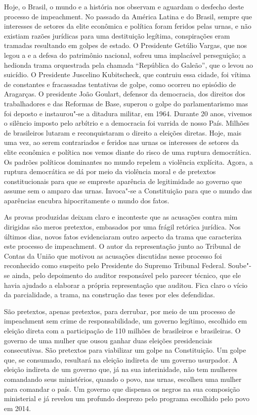 Hoje, o Brasil, o mundo e a história
nos observam e aguardam o desfecho deste processo de impeachment. No
passado da América Latina e do Brasil, sempre que interesses de setores
da elite econômica e política foram feridos pelas urnas, e não existiam
razões jurídicas para uma destituição legítima, conspirações eram
tramadas resultando em golpes de estado. O Presidente Getúlio Vargas,
que nos legou a  e a defesa do patrimônio nacional, sofreu uma
implacável perseguição; a hedionda trama orquestrada pela chamada
``República do Galeão'', que o levou ao suicídio. O Presidente Juscelino
Kubitscheck, que contruiu essa cidade, foi vítima de constantes e
fracassadas tentativas de golpe, como ocorreu no episódio de Aragarças.
O presidente João Goulart, defensor da democracia, dos direitos dos
trabalhadores e das Reformas de Base, superou o golpe do parlamentarismo
mas foi deposto e instaurou"-se a ditadura militar, em 1964. Durante 20
anos, vivemos o silêncio imposto pelo arbítrio e a democracia foi
varrida de nosso País. Milhões de brasileiros lutaram e reconquistaram o
direito a eleições diretas. Hoje, mais uma vez, ao serem contrariados e
feridos nas urnas os interesses de setores da elite econômica e política
nos vemos diante do risco de uma ruptura democrática. Os padrões
políticos dominantes no mundo repelem a violência explícita. Agora, a
ruptura democrática se dá por meio da violência moral e de pretextos
constitucionais para que se empreste aparência de legitimidade ao
governo que assume sem o amparo das urnas. Invoca"-se a Constituição para
que o mundo das aparências encubra hipocritamente o mundo dos fatos.

As provas produzidas deixam claro e inconteste que as acusações contra
mim dirigidas são meros pretextos, embasados por uma frágil retórica
jurídica. Nos últimos dias, novos fatos evidenciaram outro aspecto da
trama que caracteriza este processo de impeachment. O autor da
representação junto ao Tribunal de Contas da União que motivou as
acusações discutidas nesse processo foi reconhecido como suspeito pelo
Presidente do Supremo Tribunal Federal. Soube"-se ainda, pelo depoimento
do auditor responsável pelo parecer técnico, que ele havia ajudado a
elaborar a própria representação que auditou. Fica claro o vício da
parcialidade, a trama, na construção das teses por eles defendidas.

São
pretextos, apenas pretextos, para derrubar, por meio de um processo de
impeachment sem crime de responsabilidade, um governo legítimo,
escolhido em eleição direta com a participação de 110 milhões de
brasileiros e brasileiras. O governo de uma mulher que ousou ganhar duas
eleições presidenciais consecutivas. São pretextos para viabilizar um
golpe na Constituição. Um golpe que, se consumado, resultará na eleição
indireta de um governo usurpador. A eleição indireta de um governo que,
já na sua interinidade, não tem mulheres comandando seus ministérios,
quando o povo, nas urnas, escolheu uma mulher para comandar o país. Um
governo que dispensa os negros na sua composição ministerial e já
revelou um profundo desprezo pelo programa escolhido pelo povo em 2014.

